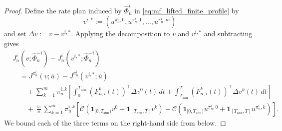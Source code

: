 \documentclass[12pt]{article}
\numberwithin{equation}{section}
\theoremstyle{definition}
\begin{document}
\begin{proof}
Define the rate plan induced by \(\widehat\Phi_n^i\) in
\eqref{eq:mf_lifted_finite_profile} by
\[
v^{i,*}
:=
\left(
u^{\pi_n^i,0},
u^{\pi_n^i,1},\ldots,u^{\pi_n^i,m}
\right)
\]
and set \(\Delta v:=v-v^{i,*}\). Applying the
decomposition to \(v\) and \(v^{i,*}\) and subtracting gives
\[
\begin{aligned}
&J_n^i(v;\widehat\Phi_n^{-i})
-J_n^i(v^{i,*};\widehat\Phi_n^{-i})
\\
&\quad=
J^{\pi_n^i}(v;\bar u)
-J^{\pi_n^i}(v^{i,*};\bar u)
\\
&\qquad+
\sum_{k=1}^m\pi_n^{i,k}
\left[
\int_0^{T_{\mathrm{ann}}}
\left(F_{n,i}^k(t)\right)^\top\Delta v^0(t)\,dt
+
\int_{T_{\mathrm{ann}}}^T
\left(F_{n,i}^k(t)\right)^\top\Delta v^k(t)\,dt
\right]
\\
&\qquad+
\frac{\varpi}{n}
\sum_{k=1}^m\pi_n^{i,k}
\left[
\mathcal C\left(
\mathbf 1_{[0,T_{\mathrm{ann}})}v^0
+\mathbf 1_{[T_{\mathrm{ann}},T]}v^k
\right)
-\mathcal C\left(
\mathbf 1_{[0,T_{\mathrm{ann}})}u^{\pi_n^i,0}
+\mathbf 1_{[T_{\mathrm{ann}},T]}u^{\pi_n^i,k}
\right)
\right].
\end{aligned}
\]
We bound each of the three terms on the right-hand side from below.


\end{proof}
\end{document}
